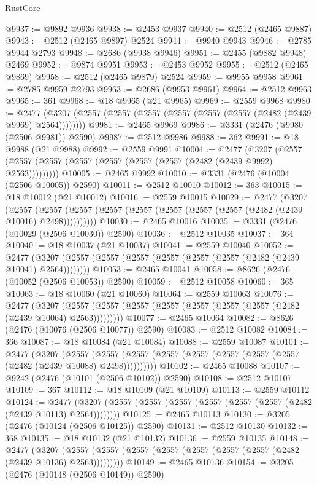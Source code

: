 \begin{lexlean}{RustCore}
\begin{coremodule}
@9937 := @9892 @9936
@9938 := @2453 @9937
@9940 := @2512 (@2465 @9887)
@9943 := @2512 (@2465 @9897) @2524
@9944 := @9940 @9943
@9946 := @2785 @9944 @2793
@9948 := @2686 (@9938 @9946)
@9951 := @2455 (@9882 @9948) @2469
@9952 := @9874 @9951
@9953 := @2453 @9952
@9955 := @2512 (@2465 @9869)
@9958 := @2512 (@2465 @9879) @2524
@9959 := @9955 @9958
@9961 := @2785 @9959 @2793
@9963 := @2686 (@9953 @9961)
@9964 := @2512 @9963
@9965 := 361
@9968 := @18 @9965 (@21 @9965)
@9969 := @2559 @9968
@9980 := @2477 (@3207 (@2557 (@2557 (@2557 (@2557 (@2557 (@2557 (@2482 (@2439 @9969) @2564))))))))
@9981 := @2465 @9969
@9986 := @3331 (@2476 (@9980 (@2506 @9981)) @2590)
@9987 := @2512 @9986
@9988 := 362
@9991 := @18 @9988 (@21 @9988)
@9992 := @2559 @9991
@10004 := @2477
    (@3207 (@2557 (@2557 (@2557 (@2557 (@2557 (@2557 (@2557 (@2482 (@2439 @9992) @2563)))))))))
@10005 := @2465 @9992
@10010 := @3331 (@2476 (@10004 (@2506 @10005)) @2590)
@10011 := @2512 @10010
@10012 := 363
@10015 := @18 @10012 (@21 @10012)
@10016 := @2559 @10015
@10029 := @2477
    (@3207
      (@2557 (@2557 (@2557 (@2557 (@2557 (@2557 (@2557 (@2557 (@2482 (@2439 @10016) @2498))))))))))
@10030 := @2465 @10016
@10035 := @3331 (@2476 (@10029 (@2506 @10030)) @2590)
@10036 := @2512 @10035
@10037 := 364
@10040 := @18 @10037 (@21 @10037)
@10041 := @2559 @10040
@10052 := @2477 (@3207 (@2557 (@2557 (@2557 (@2557 (@2557 (@2557 (@2482 (@2439 @10041) @2564))))))))
@10053 := @2465 @10041
@10058 := @8626 (@2476 (@10052 (@2506 @10053)) @2590)
@10059 := @2512 @10058
@10060 := 365
@10063 := @18 @10060 (@21 @10060)
@10064 := @2559 @10063
@10076 := @2477
    (@3207 (@2557 (@2557 (@2557 (@2557 (@2557 (@2557 (@2557 (@2482 (@2439 @10064) @2563)))))))))
@10077 := @2465 @10064
@10082 := @8626 (@2476 (@10076 (@2506 @10077)) @2590)
@10083 := @2512 @10082
@10084 := 366
@10087 := @18 @10084 (@21 @10084)
@10088 := @2559 @10087
@10101 := @2477
    (@3207
      (@2557 (@2557 (@2557 (@2557 (@2557 (@2557 (@2557 (@2557 (@2482 (@2439 @10088) @2498))))))))))
@10102 := @2465 @10088
@10107 := @9242 (@2476 (@10101 (@2506 @10102)) @2590)
@10108 := @2512 @10107
@10109 := 367
@10112 := @18 @10109 (@21 @10109)
@10113 := @2559 @10112
@10124 := @2477 (@3207 (@2557 (@2557 (@2557 (@2557 (@2557 (@2557 (@2482 (@2439 @10113) @2564))))))))
@10125 := @2465 @10113
@10130 := @3205 (@2476 (@10124 (@2506 @10125)) @2590)
@10131 := @2512 @10130
@10132 := 368
@10135 := @18 @10132 (@21 @10132)
@10136 := @2559 @10135
@10148 := @2477
    (@3207 (@2557 (@2557 (@2557 (@2557 (@2557 (@2557 (@2557 (@2482 (@2439 @10136) @2563)))))))))
@10149 := @2465 @10136
@10154 := @3205 (@2476 (@10148 (@2506 @10149)) @2590)

\end{coremodule}
\end{lexlean}
